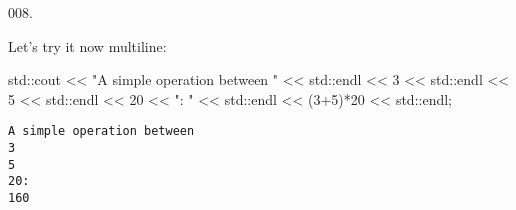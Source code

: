\documentclass[]{book}
\newenvironment{Shaded}{}{}
\newcommand{\BuiltInTok}[1]{#1}
\newcommand{\DecValTok}[1]{\textcolor[rgb]{0.25,0.63,0.44}{#1}}
\newcommand{\NormalTok}[1]{#1}
\newcommand{\StringTok}[1]{\textcolor[rgb]{0.25,0.44,0.63}{#1}}
\begin{document}
\begin{minipage}{\linewidth}\noindent
{\tiny 008.}\\
\begin{minipage}[t]{.485\linewidth}

Let's try it now multiline:

\begin{framed}

\begin{Shaded}
\begin{Highlighting}[]
\BuiltInTok{std::}\NormalTok{cout}
\NormalTok{  << }\StringTok{"A simple operation between "}\NormalTok{ << }\BuiltInTok{std::}\NormalTok{endl}
\NormalTok{  << }\DecValTok{3}\NormalTok{ << }\BuiltInTok{std::}\NormalTok{endl}
\NormalTok{  << }\DecValTok{5}\NormalTok{ << }\BuiltInTok{std::}\NormalTok{endl}
\NormalTok{  << }\DecValTok{20}\NormalTok{ << }\StringTok{": "}\NormalTok{ << }\BuiltInTok{std::}\NormalTok{endl}
\NormalTok{  << (}\DecValTok{3+5}\NormalTok{)*}\DecValTok{20}\NormalTok{ << }\BuiltInTok{std::}\NormalTok{endl;}
\end{Highlighting}
\end{Shaded}

\end{framed}

\end{minipage}
\hfill
\begin{minipage}[t]{.485\linewidth}

\begin{framed}

\begin{verbatim}
A simple operation between 
3
5
20: 
160
\end{verbatim}

\end{framed}

\end{minipage}
\end{minipage}

\vspace{2mm}\noindent\hrulefill{}
\end{document}
